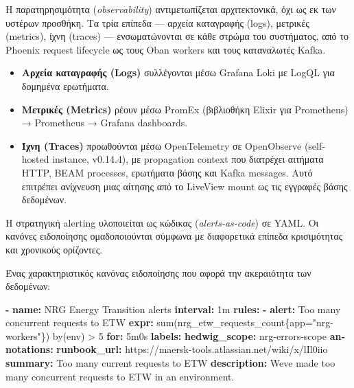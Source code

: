 \documentclass[11pt,a4paper,greek,twoside]{template-xe}
\newenvironment{Shaded}{\begin{english}\begin{snugshade}}{\end{snugshade}\end{english}}
\newcommand{\AttributeTok}[1]{\textcolor[rgb]{0.13,0.29,0.53}{#1}}
\newcommand{\FunctionTok}[1]{\textcolor[rgb]{0.13,0.29,0.53}{\textbf{#1}}}
\newcommand{\KeywordTok}[1]{\textcolor[rgb]{0.13,0.29,0.53}{\textbf{#1}}}
\providecommand{\tightlist}{\setlength{\itemsep}{0pt}\setlength{\parskip}{0pt}}
\begin{document}
Η παρατηρησιμότητα (\emph{observability}) αντιμετωπίζεται αρχιτεκτονικά,
όχι ως εκ των υστέρων προσθήκη. Τα τρία επίπεδα --- αρχεία καταγραφής
(logs), μετρικές (metrics), ίχνη (traces) --- ενσωματώνονται σε κάθε
στρώμα του συστήματος, από το Phoenix request lifecycle ως τους Oban
workers και τους καταναλωτές Kafka.

\begin{itemize}
\tightlist
\item
  \textbf{Αρχεία καταγραφής (Logs)} συλλέγονται μέσω Grafana Loki με
  LogQL για δομημένα ερωτήματα.
\item
  \textbf{Μετρικές (Metrics)} ρέουν μέσω PromEx (βιβλιοθήκη Elixir για
  Prometheus) → Prometheus → Grafana dashboards.
\item
  \textbf{Ίχνη (Traces)} προωθούνται μέσω OpenTelemetry σε OpenObserve
  (self-hosted instance, v0.14.4), με propagation context που διατρέχει
  αιτήματα HTTP, BEAM processes, ερωτήματα βάσης και Kafka messages.
  Αυτό επιτρέπει ανίχνευση μιας αίτησης από το LiveView mount ως τις
  εγγραφές βάσης δεδομένων.
\end{itemize}

Η στρατηγική alerting υλοποιείται ως κώδικας (\emph{alerts-as-code}) σε
YAML. Οι κανόνες ειδοποίησης ομαδοποιούνται σύμφωνα με διαφορετικά
επίπεδα κρισιμότητας και χρονικούς ορίζοντες.

Ένας χαρακτηριστικός κανόνας ειδοποίησης που αφορά την ακεραιότητα των
δεδομένων:

\begin{Shaded}
\begin{Highlighting}[]
\KeywordTok{{-}}\AttributeTok{ }\FunctionTok{name}\KeywordTok{:}\AttributeTok{ NRG Energy Transition alerts}
\AttributeTok{  }\FunctionTok{interval}\KeywordTok{:}\AttributeTok{ 1m}
\AttributeTok{  }\FunctionTok{rules}\KeywordTok{:}
\AttributeTok{    }\KeywordTok{{-}}\AttributeTok{ }\FunctionTok{alert}\KeywordTok{:}\AttributeTok{ Too many concurrent requests to ETW}
\AttributeTok{      }\FunctionTok{expr}\KeywordTok{:}\AttributeTok{ sum(nrg\_etw\_requests\_count\{app="nrg{-}workers"\}) by(env) \textgreater{} 5}
\AttributeTok{      }\FunctionTok{for}\KeywordTok{:}\AttributeTok{ 5m0s}
\AttributeTok{      }\FunctionTok{labels}\KeywordTok{:}
\AttributeTok{        }\FunctionTok{hedwig\_scope}\KeywordTok{:}\AttributeTok{ nrg{-}errors{-}scope}
\AttributeTok{      }\FunctionTok{annotations}\KeywordTok{:}
\AttributeTok{        }\FunctionTok{runbook\_url}\KeywordTok{:}\AttributeTok{ https://maersk{-}tools.atlassian.net/wiki/x/lIl0iio}
\AttributeTok{        }\FunctionTok{summary}\KeywordTok{:}\AttributeTok{ Too many current requests to ETW}
\AttributeTok{        }\FunctionTok{description}\KeywordTok{:}\AttributeTok{ We\textquotesingle{}ve made too many concurrent requests to ETW in an environment.}
\end{Highlighting}
\end{Shaded}
\end{document}
